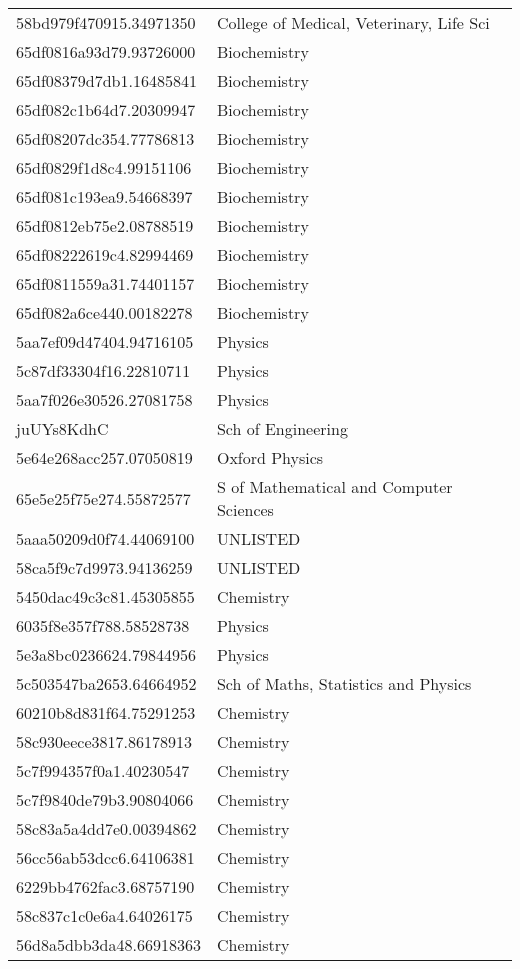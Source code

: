 \begin{tabular}{ll}
58bd979f470915.34971350 & College of Medical, Veterinary, Life Sci \\
65df0816a93d79.93726000 & Biochemistry \\
65df08379d7db1.16485841 & Biochemistry \\
65df082c1b64d7.20309947 & Biochemistry \\
65df08207dc354.77786813 & Biochemistry \\
65df0829f1d8c4.99151106 & Biochemistry \\
65df081c193ea9.54668397 & Biochemistry \\
65df0812eb75e2.08788519 & Biochemistry \\
65df08222619c4.82994469 & Biochemistry \\
65df0811559a31.74401157 & Biochemistry \\
65df082a6ce440.00182278 & Biochemistry \\
5aa7ef09d47404.94716105 & Physics \\
5c87df33304f16.22810711 & Physics \\
5aa7f026e30526.27081758 & Physics \\
juUYs8KdhC & Sch of Engineering \\
5e64e268acc257.07050819 & Oxford Physics \\
65e5e25f75e274.55872577 & S of Mathematical and Computer Sciences \\
5aaa50209d0f74.44069100 & UNLISTED \\
58ca5f9c7d9973.94136259 & UNLISTED \\
5450dac49c3c81.45305855 & Chemistry \\
6035f8e357f788.58528738 & Physics \\
5e3a8bc0236624.79844956 & Physics \\
5c503547ba2653.64664952 & Sch of Maths, Statistics and Physics \\
60210b8d831f64.75291253 & Chemistry \\
58c930eece3817.86178913 & Chemistry \\
5c7f994357f0a1.40230547 & Chemistry \\
5c7f9840de79b3.90804066 & Chemistry \\
58c83a5a4dd7e0.00394862 & Chemistry \\
56cc56ab53dcc6.64106381 & Chemistry \\
6229bb4762fac3.68757190 & Chemistry \\
58c837c1c0e6a4.64026175 & Chemistry \\
56d8a5dbb3da48.66918363 & Chemistry \\

\end{tabular}
